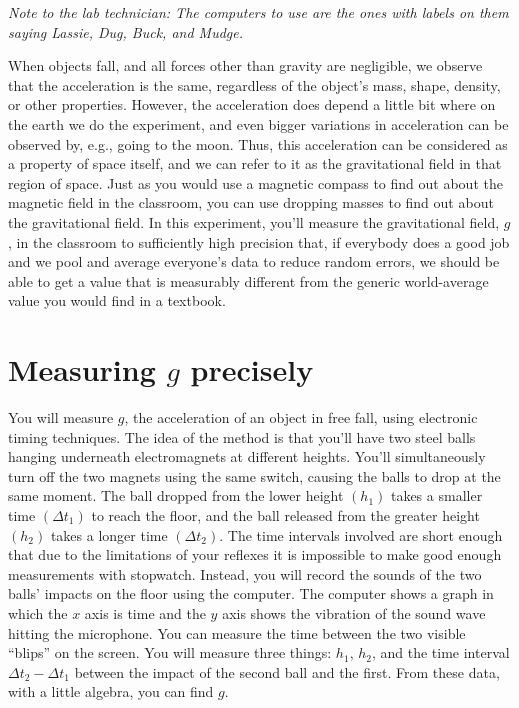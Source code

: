 \label{lab:g}

\emph{Note to the lab technician: The computers to use are the ones
with labels on them saying Lassie, Dug, Buck, and Mudge.}

\apparatus
{}


\introduction
When objects fall, and all forces other than gravity are negligible,
we observe that the acceleration is the same, regardless of the object's
mass, shape, density, or other properties. However, the acceleration does
depend a little bit where on the earth we do the experiment, and even bigger
variations in acceleration can be observed by, e.g., going to the moon.
Thus, this acceleration can be considered as a property of space itself,
and we can refer to it as the gravitational field in that region of space.
Just as you would use a magnetic compass to find out about the magnetic field
in the classroom, you can use dropping masses to find out about the gravitational
field. In this experiment, you'll measure the gravitational field, $g$, in the
classroom to sufficiently high precision that, if everybody does a good job and
we pool and average everyone's data to reduce random errors, we should be able to
get a value that is measurably different from the generic world-average value you
would find in a textbook.

\section*{Measuring $g$ precisely}
You will measure $g$, the
acceleration of an object in free fall, using electronic
timing techniques. The idea of the method is that you'll
have two steel balls hanging underneath electromagnets at
different heights. You'll simultaneously turn off the two
magnets using the same switch, causing the balls to drop at
the same moment. The ball dropped from the lower height
$(h_1)$ takes a smaller time $(\Delta t_1)$ to reach the floor, and
the ball released from the greater height $(h_2)$ takes a
longer time $(\Delta t_2)$. The time intervals involved are short
enough that due to the limitations of your reflexes it is
impossible to make good enough measurements with stopwatch. 
Instead, you will record the sounds of the two balls'
impacts on the floor using the computer.  The computer
shows a graph in which the $x$ axis is time and the $y$ axis
shows the vibration of the sound wave hitting the microphone.
You can measure the time between the two visible ``blips''
on the screen.  You will measure three things: $h_1$, $h_2$,
and the time interval $\Delta t_2-\Delta t_1$ between the impact of the
second ball and the first.  From these data, with a little
algebra, you can find $g$.

